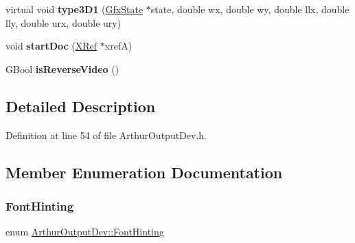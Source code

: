 \begin{DoxyCompactItemize}
\item 
\mbox{\label{class_arthur_output_dev_ad6b9f26e561860943d1dfdbaec9d733a}} 
virtual void {\bfseries type3\+D1} (\hyperlink{class_gfx_state}{Gfx\+State} $\ast$state, double wx, double wy, double llx, double lly, double urx, double ury)
\item 
\mbox{\label{class_arthur_output_dev_a9012cde63e9d36ef93d9ea1510f22893}} 
void {\bfseries start\+Doc} (\hyperlink{class_x_ref}{X\+Ref} $\ast$xrefA)
\item 
\mbox{\label{class_arthur_output_dev_ab363ab0fec0cea81f5b7babf82c6a917}} 
G\+Bool {\bfseries is\+Reverse\+Video} ()
\end{DoxyCompactItemize}


\subsection{Detailed Description}


Definition at line 54 of file Arthur\+Output\+Dev.\+h.



\subsection{Member Enumeration Documentation}
\mbox{\label{class_arthur_output_dev_adf1c06826670a14bb7199333c90c1a3b}} 
\subsubsection{\texorpdfstring{Font\+Hinting}{FontHinting}}
{\footnotesize\ttfamily enum \hyperlink{class_arthur_output_dev_adf1c06826670a14bb7199333c90c1a3b}{Arthur\+Output\+Dev\+::\+Font\+Hinting}}

